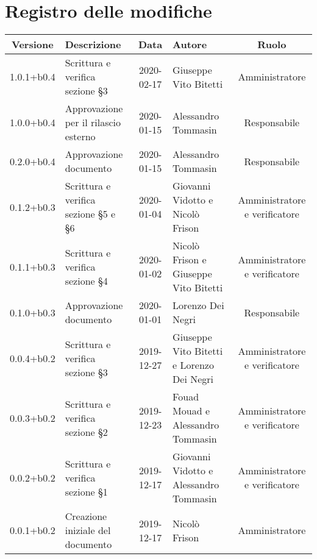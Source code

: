 \section*{Registro delle modifiche}

\begin{center}
	\begin{longtable}{|c|p{3cm}|c|p{4cm}|c|}
	\hline
	\rowcolor{lighter-grayer}
	\textbf{Versione} & \textbf{Descrizione} & \textbf{Data} & \textbf{Autore} & \textbf{Ruolo} \\
	\hline
	\endfirsthead


	1.0.1+b0.4 & Scrittura e verifica sezione \S3  & 2020-02-17 & Giuseppe Vito Bitetti & Amministratore \\
	\hline
	1.0.0+b0.4 & Approvazione per il rilascio esterno & 2020-01-15 & Alessandro Tommasin & Responsabile \\
	\hline
	0.2.0+b0.4 & Approvazione documento & 2020-01-15 & Alessandro Tommasin & Responsabile \\
	\hline
	0.1.2+b0.3 & Scrittura e verifica sezione \S5 e \S6 & 2020-01-04 & Giovanni Vidotto e Nicolò Frison & Amministratore e verificatore \\
	\hline
	0.1.1+b0.3 &  Scrittura e verifica sezione \S4 & 2020-01-02 & Nicolò Frison e Giuseppe Vito Bitetti & Amministratore e verificatore \\
	\hline
	0.1.0+b0.3 & Approvazione documento & 2020-01-01 & Lorenzo Dei Negri & Responsabile \\
	\hline
	0.0.4+b0.2 & Scrittura e verifica sezione \S3 & 2019-12-27  & Giuseppe Vito Bitetti e Lorenzo Dei Negri & Amministratore e verificatore \\
	\hline
	0.0.3+b0.2 & Scrittura e verifica sezione \S2 & 2019-12-23 & Fouad Mouad e Alessandro Tommasin & Amministratore e verificatore \\
	\hline
	0.0.2+b0.2 & Scrittura e verifica sezione \S1 & 2019-12-17 & Giovanni Vidotto e Alessandro Tommasin & Amministratore e verificatore \\
	\hline
	0.0.1+b0.2 & Creazione iniziale del documento & 2019-12-17 & Nicolò Frison & Amministratore \\
	\hline

	\end{longtable}
\end{center}
